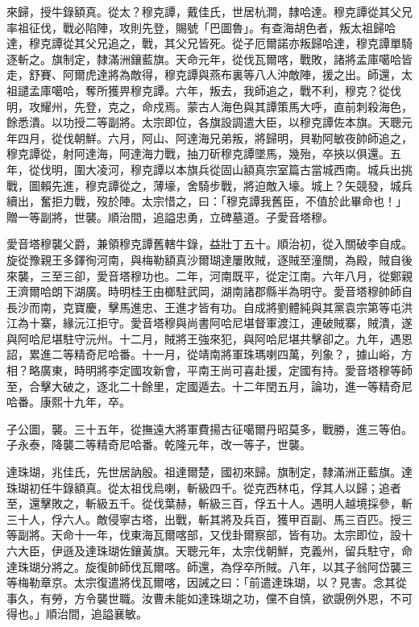 \begin{pinyinscope}
來歸，授牛錄額真。從太？穆克譚，戴佳氏，世居杭澗，隸哈達。穆克譚從其父兄率祖征伐，戰必陷陣，攻則先登，賜號「巴圖魯」。有查海胡色者，叛太祖歸哈達，穆克譚從其父兄追之，戰，其父兄皆死。從子厄爾諾亦叛歸哈達，穆克譚單騎逐斬之。旗制定，隸滿洲鑲藍旗。天命元年，從伐瓦爾喀，戰敗，諸將孟庫噶哈皆走，舒賽、阿爾虎達將為敵得，穆克譚與燕布裏等八人沖敵陣，援之出。師還，太祖譴孟庫噶哈，奪所獲畀穆克譚。六年，叛去，我師追之，戰不利，穆克？從伐明，攻耀州，先登，克之，命戍焉。蒙古人海色與其譚策馬大呼，直前刺殺海色，餘悉潰。以功授二等副將。太宗即位，各旗設調遣大臣，以穆克譚佐本旗。天聰元年四月，從伐朝鮮。六月，阿山、阿達海兄弟叛，將歸明，貝勒阿敏夜帥師追之，穆克譚從，射阿達海，阿達海力戰，抽刀斫穆克譚墜馬，幾殆，卒挾以俱還。五年，從伐明，圍大凌河，穆克譚以本旗兵從固山額真宗室篇古當城西南。城兵出挑戰，圖賴先進，穆克譚從之，薄壕，舍騎步戰，將迫敵入壕。城上？矢競發，城兵續出，奮拒力戰，歿於陣。太宗惜之，曰：「穆克譚我舊臣，不值於此畢命也！」贈一等副將，世襲。順治間，追謚忠勇，立碑墓道。子愛音塔穆。

愛音塔穆襲父爵，兼領穆克譚舊轄牛錄，益壯丁五十。順治初，從入關破李自成。旋從豫親王多鐸徇河南，與梅勒額真沙爾瑚達屢敗賊，逐賊至潼關，為殿，賊自後來襲，三至三卻，愛音塔穆功也。二年，河南既平，從定江南。六年八月，從鄭親王濟爾哈朗下湖廣。時明桂王由榔駐武岡，湖南諸郡縣半為明守。愛音塔穆帥師自長沙而南，克寶慶，擊馬進忠、王進才皆有功。自成將劉體純與其黨袁宗第等屯洪江為十寨，緣沅江拒守。愛音塔穆與尚書阿哈尼堪督軍渡江，連破賊寨，賊潰，遂與阿哈尼堪駐守沅州。十二月，賊將王強來犯，與阿哈尼堪共擊卻之。九年，遇恩詔，累進二等精奇尼哈番。十一月，從靖南將軍珠瑪喇四萬，列象？，據山峪，方相？略廣東，時明將李定國攻新會，平南王尚可喜赴援，定國有持。愛音塔穆等師至，合擊大破之，逐北二十餘里，定國遁去。十二年閏五月，論功，進一等精奇尼哈番。康熙十九年，卒。

子公圖，襲。三十五年，從撫遠大將軍費揚古征噶爾丹昭莫多，戰勝，進三等伯。子永泰，降襲二等精奇尼哈番。乾隆元年，改一等子，世襲。

達珠瑚，兆佳氏，先世居訥殷。祖達爾楚，國初來歸。旗制定，隸滿洲正藍旗。達珠瑚初任牛錄額真。從太祖伐烏喇，斬級四千。從克西林屯，俘其人以歸；追者至，還擊敗之，斬級五千。從伐葉赫，斬級三百，俘五十人。遇明人越境採參，斬三十人，俘六人。敵侵寧古塔，出戰，斬其將及兵百，獲甲百副、馬三百匹。授三等副將。天命十一年，伐東海瓦爾喀部，又伐卦爾察部，皆有功。太宗即位，設十六大臣，伊遜及達珠瑚佐鑲黃旗。天聰元年，太宗伐朝鮮，克義州，留兵駐守，命達珠瑚分將之。旋復帥師伐瓦爾喀。師還，為俘卒所賊。八年，以其子翁阿岱襲三等梅勒章京。太宗復遣將伐瓦爾喀，因誡之曰：「前遣達珠瑚，以？見害。念其從事久，有勞，方令襲世職。汝曹未能如達珠瑚之功，儻不自慎，欲覬例外恩，不可得也。」順治間，追謚襄敏。


\end{pinyinscope}
